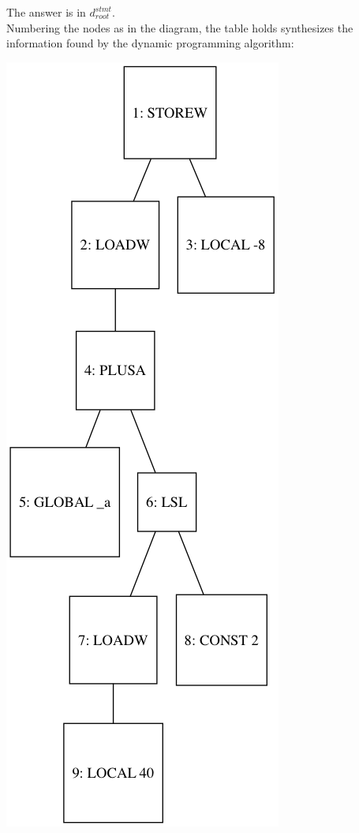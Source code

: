 The answer is in $d_{root}^{stmt}$. \\
\newpage
Numbering the nodes as in the diagram, the table holds synthesizes the information found by the dynamic programming algorithm:

\begin{minipage}[c]{.5\textwidth}
\includegraphics[width=.7\textwidth]{ex1.png}
\end{minipage}
